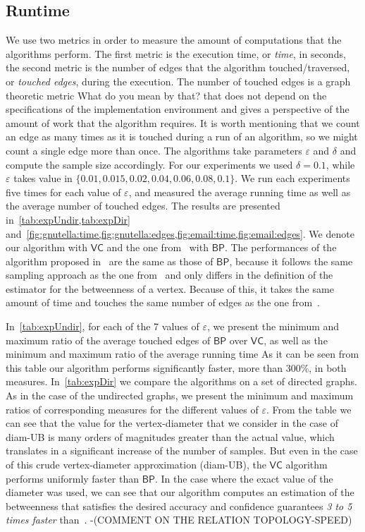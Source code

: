 \subsection{Runtime}\label{sec:runtime}
We use two metrics in order to measure the amount of computations that the
algorithms perform. The first metric is the execution time, or \textit{time}, in
seconds, the second metric is the number of edges that the algorithm
touched/traversed, or \textit{touched edges}, during the execution. The number
of touched edges is a graph theoretic metric \XXX What do you mean by that? that
does not depend on the specifications of the implementation environment and
gives a perspective of the amount of work that the algorithm requires. It is
worth mentioning that we count an edge as many times as it is touched during
a run of an algorithm, so we might count a single edge more than once. The
algorithms take parameters $\varepsilon$ and $\delta$ and compute the sample
size accordingly. For our experiments we used $\delta=0.1$, while $\varepsilon$
takes value in $\{0.01, 0.015, 0.02, 0.04, 0.06, 0.08, 0.1\}$. We run each
experiments five times for each value of $\varepsilon$, and measured the average
running time as well as the average number of touched edges. 
The results are presented in~\cref{tab:expUndir,tab:expDir}
and~\cref{fig:gnutella:time,fig:gnutella:edges,fig:email:time,fig:email:edges}.
We denote our algorithm with $\mathsf{VC}$ and the one from~\citep{BrandesP07}
with $\mathsf{BP}$. The performances of the algorithm proposed
in~\citep{GeisbergerSS08} are the same as those of $\mathsf{BP}$, because it
follows the same sampling approach as the one
from~\citep{BrandesP07,JacobKLPT05} and only differs in the definition of the
estimator for the betweenness of a vertex. Because of this, it takes the same
amount of time and touches the same number of edges as the one
from~\citep{BrandesP07}.

In~\cref{tab:expUndir}, for each of
the 7 values of $\varepsilon$, we present the minimum and maximum ratio of the
average touched edges of $\mathsf{BP}$ over $\mathsf{VC}$, as well as the
minimum and maximum ratio of the average running time %
As it can be seen from this table our algorithm performs significantly faster,
more than 300\%, in both measures. In~\cref{tab:expDir} we compare the
algorithms on a set of directed graphs. As in the case of the undirected graphs,
we present the minimum and maximum ratios of corresponding measures for the
different values of $\varepsilon$. From the table we can see
that the value for the vertex-diameter that we consider in the case of diam-UB
is many orders of magnitudes greater than the actual value, which translates in
a significant increase of the number of samples. But even in the case of this
crude vertex-diameter approximation (diam-UB), the $\mathsf{VC}$ algorithm
performs uniformly faster than $\mathsf{BP}$. In the case where the exact value
of the diameter was used, we can see that our algorithm computes an estimation
of the betweenness that satisfies the desired accuracy and confidence guarantees
\emph{3 to 5 times faster} than~\citep{BrandesP07}. \XXX-(COMMENT ON THE
RELATION TOPOLOGY-SPEED) 

